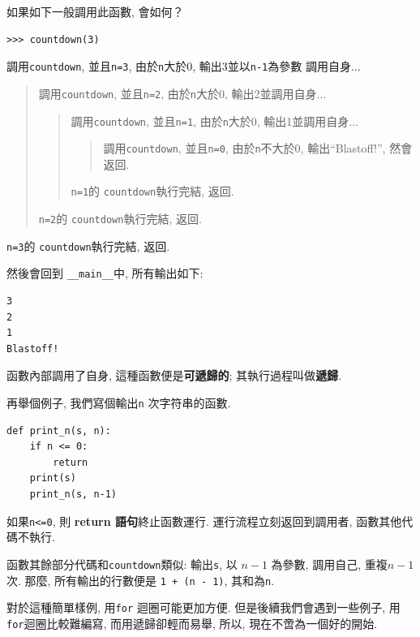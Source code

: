\documentclass[10pt]{book}
\begin{document}
如果如下一般調用此函數, 會如何？

\begin{verbatim}
>>> countdown(3)
\end{verbatim}
%

調用{\tt countdown}, 並且{\tt n=3}, 由於{\tt n}大於0, 輸出3並以{\tt n-1}為參數
調用自身...

\begin{quote}
調用{\tt countdown},  並且{\tt n=2}, 由於{\tt n}大於0, 輸出2並調用自身...

\begin{quote}
調用{\tt countdown},  並且{\tt n=1}, 由於{\tt n}大於0, 輸出1並調用自身...

\begin{quote}
調用{\tt countdown},  並且{\tt n=0}, 由於{\tt n}不大於0, 輸出``Blastoff!'', 
然會返回. 
\end{quote}

{\tt n=1}的 {\tt countdown}執行完結, 返回. 
\end{quote}

{\tt n=2}的 {\tt countdown}執行完結, 返回. 
\end{quote}

{\tt n=3}的 {\tt countdown}執行完結, 返回. 

然後會回到 \verb"__main__"中,  所有輸出如下:

\begin{verbatim}
3
2
1
Blastoff!
\end{verbatim}
%
函數內部調用了自身, 這種函數便是{\bf 可遞歸的};
其執行過程叫做{\bf 遞歸}.

再舉個例子, 我們寫個輸出{\tt n} 次字符串的函數.

\begin{verbatim}
def print_n(s, n):
    if n <= 0:
        return
    print(s)
    print_n(s, n-1)
\end{verbatim}
%
如果{\tt n<=0}, 則 {\bf return 語句}終止函數運行. 
運行流程立刻返回到調用者, 函數其他代碼不執行. 

函數其餘部分代碼和{\tt countdown}類似: 
輸出{\tt s},  以 $n-1$ 為參數, 調用自己, 重複$n-1$次. 
那麼, 所有輸出的行數便是 {\tt 1 + (n - 1)},  其和為{\tt n}. 

對於這種簡單樣例, 用{\tt for} 迴圈可能更加方便. 
但是後續我們會遇到一些例子, 用{\tt for}迴圈比較難編寫, 而用遞歸卻輕而易舉, 
所以, 現在不啻為一個好的開始. 
\end{document}
